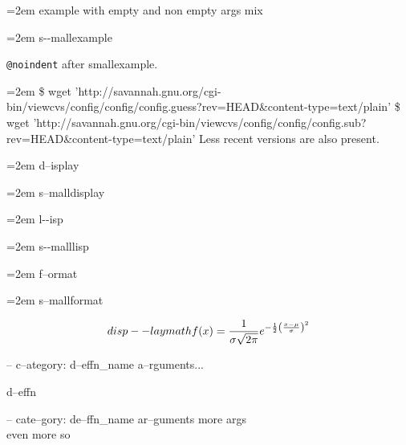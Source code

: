 \documentclass{book}
\begin{document}
\par\begingroup\obeylines\obeyspaces\frenchspacing\leftskip=2em\relax\parskip=0pt\relax\ttfamily{}%
example with empty and non empty args mix
\endgroup{}%

\par\begingroup\obeylines\obeyspaces\frenchspacing\leftskip=2em\relax\parskip=0pt\relax\ttfamily\footnotesize{}%
s{-}{-}mallexample
\endgroup{}%

\texttt{@noindent} after smallexample.
\par\begingroup\obeylines\obeyspaces\frenchspacing\leftskip=2em\relax\parskip=0pt\relax\ttfamily\footnotesize{}%
\$ wget 'http://savannah.gnu.org/cgi-bin/viewcvs/config/config/config.guess?rev=HEAD\&content-type=text/plain'
\$ wget 'http://savannah.gnu.org/cgi-bin/viewcvs/config/config/config.sub?rev=HEAD\&content-type=text/plain'
\endgroup{}%
\noindent{}Less recent versions are also present.

\par\begingroup\obeylines\obeyspaces\frenchspacing\leftskip=2em\relax\parskip=0pt\relax{}%
d--isplay
\endgroup{}%

\par\begingroup\obeylines\obeyspaces\frenchspacing\leftskip=2em\relax\parskip=0pt\relax\footnotesize{}%
s--malldisplay
\endgroup{}%

\par\begingroup\obeylines\obeyspaces\frenchspacing\leftskip=2em\relax\parskip=0pt\relax\ttfamily{}%
l{-}{-}isp
\endgroup{}%

\par\begingroup\obeylines\obeyspaces\frenchspacing\leftskip=2em\relax\parskip=0pt\relax\ttfamily\footnotesize{}%
s{-}{-}malllisp
\endgroup{}%

\par\begingroup\obeylines\obeyspaces\frenchspacing\leftskip=2em\relax\parskip=0pt\relax{}%
f--ormat
\endgroup{}%

\par\begingroup\obeylines\obeyspaces\frenchspacing\leftskip=2em\relax\parskip=0pt\relax\footnotesize{}%
s--mallformat
\endgroup{}%

$$
disp--laymath
f(x) = {1 \over \sigma \sqrt{2\pi}}e^{-{1 \over 2}\left({x-\mu \over \sigma}\right)^2}
$$

\hbox{}-- c--ategory: d--effn\_name a--rguments...


%
d--effn

\hbox{}-- cate--gory: de--ffn\_name ar--guments    more args \leavevmode{}\\ even more so
\end{document}
